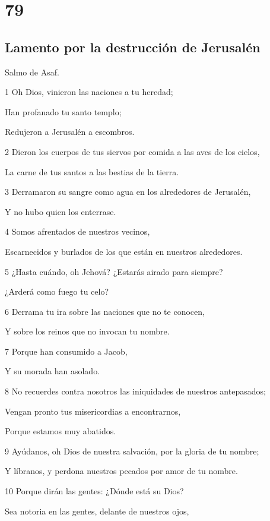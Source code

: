 \chapter{79}

\section*{Lamento por la destrucción de Jerusalén}

\par Salmo de Asaf.

\par 1 Oh Dios, vinieron las naciones a tu heredad;
\par Han profanado tu santo templo;
\par Redujeron a Jerusalén a escombros.
\par 2 Dieron los cuerpos de tus siervos por comida a las aves de los cielos,
\par La carne de tus santos a las bestias de la tierra.
\par 3 Derramaron su sangre como agua en los alrededores de Jerusalén,
\par Y no hubo quien los enterrase.
\par 4 Somos afrentados de nuestros vecinos,
\par Escarnecidos y burlados de los que están en nuestros alrededores.
\par 5 ¿Hasta cuándo, oh Jehová? ¿Estarás airado para siempre?
\par ¿Arderá como fuego tu celo?
\par 6 Derrama tu ira sobre las naciones que no te conocen,
\par Y sobre los reinos que no invocan tu nombre.
\par 7 Porque han consumido a Jacob,
\par Y su morada han asolado.
\par 8 No recuerdes contra nosotros las iniquidades de nuestros antepasados;
\par Vengan pronto tus misericordias a encontrarnos,
\par Porque estamos muy abatidos.
\par 9 Ayúdanos, oh Dios de nuestra salvación, por la gloria de tu nombre;
\par Y líbranos, y perdona nuestros pecados por amor de tu nombre.
\par 10 Porque dirán las gentes: ¿Dónde está su Dios?
\par Sea notoria en las gentes, delante de nuestros ojos,
